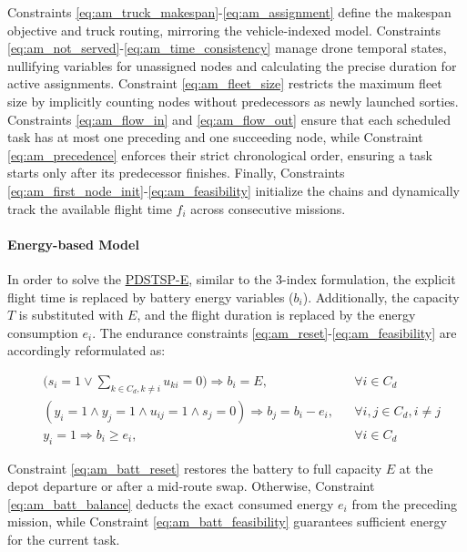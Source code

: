 \documentclass[3p, authoryear, 11pt]{elsarticle}
\begin{document}
Constraints \eqref{eq:am_truck_makespan}-\eqref{eq:am_assignment} define the makespan objective and truck routing, mirroring the vehicle-indexed model. Constraints \eqref{eq:am_not_served}-\eqref{eq:am_time_consistency} manage drone temporal states, nullifying variables for unassigned nodes and calculating the precise duration for active assignments. Constraint \eqref{eq:am_fleet_size} restricts the maximum fleet size by implicitly counting nodes without predecessors as newly launched sorties. Constraints \eqref{eq:am_flow_in} and \eqref{eq:am_flow_out} ensure that each scheduled task has at most one preceding and one succeeding node, while Constraint \eqref{eq:am_precedence} enforces their strict chronological order, ensuring a task starts only after its predecessor finishes. Finally, Constraints \eqref{eq:am_first_node_init}-\eqref{eq:am_feasibility} initialize the chains and dynamically track the available flight time $f_i$ across consecutive missions.

\paragraph{Energy-based Model} In order to solve the \hyperref[sec:energy_model_des]{PDSTSP-E}, similar to the 3-index formulation, the explicit flight time is replaced by battery energy variables ($b_i$). Additionally, the capacity $T$ is substituted with $E$, and the flight duration is replaced by the energy consumption $e_i$. The endurance constraints \eqref{eq:am_reset}-\eqref{eq:am_feasibility} are accordingly reformulated as:

\begin{align}
    & \Big(s_{i} = 1 \lor \sum_{k \in C_d, k \neq i} u_{ki} = 0 \Big) \Rightarrow b_{i} = E, && \forall i \in C_d \label{eq:am_batt_reset} \\[2pt]
    & (y_i=1 \land y_j=1 \land u_{ij}=1 \land s_{j}=0) \Rightarrow b_{j} = b_{i} - e_i, && \forall i,j \in C_d, i \neq j \label{eq:am_batt_balance} \\[2pt]
    & y_{i}=1 \Rightarrow b_{i} \ge e_i, && \forall i \in C_d \label{eq:am_batt_feasibility}
\end{align}

Constraint \eqref{eq:am_batt_reset} restores the battery to full capacity $E$ at the depot departure or after a mid-route swap. Otherwise, Constraint \eqref{eq:am_batt_balance} deducts the exact consumed energy $e_i$ from the preceding mission, while Constraint \eqref{eq:am_batt_feasibility} guarantees sufficient energy for the current task.
\end{document}
